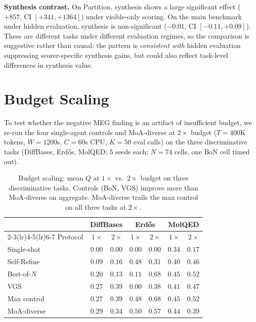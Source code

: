 \documentclass{article}
\begin{document}
\textbf{Synthesis contrast.} On Partition, synthesis shows a large significant effect ($+857$, CI $[+341, +1364]$) under visible-only scoring. On the main benchmark under hidden evaluation, synthesis is non-significant ($-0.01$, CI $[-0.11, +0.09]$). These are different tasks under different evaluation regimes, so the comparison is suggestive rather than causal: the pattern is \emph{consistent with} hidden evaluation suppressing scorer-specific synthesis gains, but could also reflect task-level differences in synthesis value.

\section{Budget Scaling}
\label{app:budget-scaling}

To test whether the negative MEG finding is an artifact of insufficient budget, we re-run the four single-agent controls and MoA-diverse at $2{\times}$ budget ($T{=}400$K tokens, $W{=}1200$s, $C{=}60$s CPU, $K{=}50$ eval calls) on the three discriminative tasks (DiffBases, Erd\H{o}s, MolQED; 5 seeds each; $N{=}74$ cells, one BoN cell timed out).

\begin{table}[h]
\caption{Budget scaling: mean $Q$ at $1{\times}$ vs.\ $2{\times}$ budget on three discriminative tasks. Controls (BoN, VGS) improve more than MoA-diverse on aggregate. MoA-diverse trails the max control on all three tasks at $2{\times}$.}
\label{tab:budget2x}
\centering
\small
\begin{tabular}{l r r r r r r}
\toprule
& \multicolumn{2}{c}{DiffBases} & \multicolumn{2}{c}{Erd\H{o}s} & \multicolumn{2}{c}{MolQED} \\
\cmidrule(lr){2-3}\cmidrule(lr){4-5}\cmidrule(lr){6-7}
Protocol & $1{\times}$ & $2{\times}$ & $1{\times}$ & $2{\times}$ & $1{\times}$ & $2{\times}$ \\
\midrule
Single-shot & $0.00$ & $0.00$ & $0.00$ & $0.00$ & $0.34$ & $0.17$ \\
Self-Refine & $0.09$ & $0.16$ & $0.48$ & $0.31$ & $0.40$ & $0.46$ \\
Best-of-$N$ & $0.20$ & $0.13$ & $0.11$ & $\mathbf{0.68}$ & $0.45$ & $0.52$ \\
VGS         & $0.27$ & $\mathbf{0.39}$ & $0.00$ & $0.38$ & $0.41$ & $0.47$ \\
\midrule
Max control & $0.27$ & $0.39$ & $0.48$ & $0.68$ & $0.45$ & $0.52$ \\
\midrule
MoA-diverse & $0.29$ & $0.34$ & $0.50$ & $0.57$ & $0.44$ & $0.39$ \\
\bottomrule
\end{tabular}
\end{table}
\end{document}

